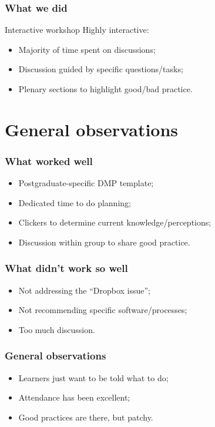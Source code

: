 \begin{frame}
  \frametitle{What we did}
  
  \begin{block}{Interactive workshop}
    Highly interactive:
    \begin{itemize}
      \item Majority of time spent on discussions;
      \item Discussion guided by specific questions/tasks;
      \item Plenary sections to highlight good/bad practice.
    \end{itemize}
  \end{block}
\end{frame}
\section{General observations}

\begin{frame}
  \frametitle{What worked well}
  
  \begin{itemize}[<+>]
    \item Postgraduate-specific DMP template;
    \item Dedicated time to do planning;
    \item Clickers to determine current knowledge/perceptions;
    \item Discussion within group to share good practice.
  \end{itemize}
\end{frame}

\begin{frame}
  \frametitle{What didn't work so well}
  
  \begin{itemize}[<+>]
    \item Not addressing the ``Dropbox issue'';
    \item Not recommending specific software/processes;
    \item Too much discussion.
  \end{itemize}
\end{frame}

\begin{frame}
  \frametitle{General observations}
  
  \begin{itemize}[<+>]
    \item Learners just want to be told what to do;
    \item Attendance has been excellent;
    \item Good practices are there, but patchy.
  \end{itemize}
\end{frame}

